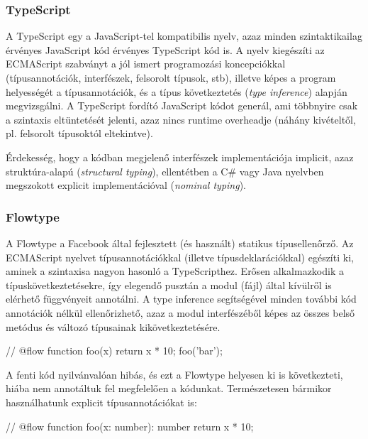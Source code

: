 \subsubsection{TypeScript}

A TypeScript\cite{typescript} egy a JavaScript-tel kompatibilis nyelv, azaz
minden szintaktikailag érvényes JavaScript kód érvényes TypeScript kód is.  A
nyelv kiegészíti az ECMAScript szabványt a jól ismert programozási koncepciókkal
(típusannotációk, interfészek, felsorolt típusok, stb), illetve képes a program
helyességét a típusannotációk, és a típus következtetés (\emph{type inference})
alapján megvizsgálni.  A TypeScript fordító JavaScript kódot generál, ami
többnyire csak a szintaxis eltüntetését jelenti, azaz nincs runtime overheadje
(náhány kivételtől, pl. felsorolt típusoktól eltekintve).

Érdekesség, hogy a kódban megjelenő interfészek implementációja implicit, azaz
struktúra-alapú (\emph{structural typing}), ellentétben a C\# vagy Java nyelvben
megszokott explicit implementációval (\emph{nominal typing}\cite[197.
oldal]{tsdeep}).

\subsubsection{Flowtype}\label{sec:flowtype}

A Flowtype\cite{flowtype} a Facebook által fejlesztett (és használt) statikus
típusellenőrző.  Az ECMAScript nyelvet típusannotációkkal (illetve
típusdeklarációkkal) egészíti ki, aminek a szintaxisa nagyon hasonló a
TypeScripthez.  Erősen alkalmazkodik a típuskövetkeztetésekre, így elegendő
pusztán a modul (fájl) által kívülről is elérhető függvényeit annotálni.  A type
inference segítségével minden további kód annotációk nélkül ellenőrizhető, azaz
a modul interfészéből képes az összes belső metódus és változó típusainak
kikövetkeztetésére.

\begin{js}
// @flow
function foo(x) {
  return x * 10;
}
foo('bar');
\end{js}

A fenti kód nyilvánvalóan hibás, és ezt a Flowtype helyesen ki is következteti,
hiába nem annotáltuk fel megfelelően a kódunkat. Természetesen bármikor
használhatunk explicit típusannotációkat is:

\begin{js}
// @flow
function foo(x: number): number {
  return x * 10;
}
\end{js}

